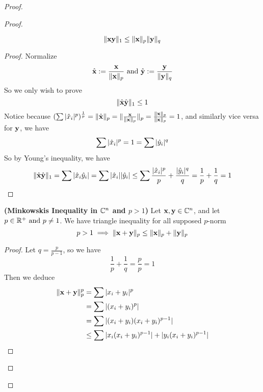\documentclass{report}
\begin{document}
\begin{proof}
\begin{proof}
\begin{theorem}
\begin{equation}
\| \textbf{xy} \|_1\leq \| \textbf{x} \|_p\| \textbf{y} \|_q
\end{equation}
\end{theorem}
\begin{proof}
Normalize 
\begin{equation}
\hat{\textbf{x}}:= \frac{\textbf{x}}{\| \textbf{x} \|_p}\text{ and }\hat{\textbf{y}}:=\frac{\textbf{y}}{\| \textbf{y} \|_q}
\end{equation}
So we only wish to prove
\begin{equation}
\| \hat{\textbf{x}}\hat{\textbf{y}} \|_1\leq 1 
\end{equation}
Notice because $(\sum |\hat{x}_i|^p)^{\frac{1}{p}}=\| \hat{\textbf{x}} \|_p=\| \frac{\textbf{x}}{\| \textbf{x} \|_p} \|_p=\frac{\| \textbf{x} \|_p}{\| \textbf{x} \|_p}=1$, and similarly vice versa for $\textbf{y}$, we have \begin{equation}
\sum |\hat{x}_i|^p=1=\sum |\hat{y}_i|^q \end{equation} So by Young's inequality, we have \begin{equation} \| \hat{\textbf{x}}\hat{\textbf{y}} \|_1= \sum |\hat{x }_i\hat{y}_i|=\sum |\hat{x}_i||\hat{y}_i|\leq \sum \frac{|\hat{x}_i|^p}{p}+\frac{|\hat{y}_i|^q}{q}=\frac{1}{p}+\frac{1}{q}=1
\end{equation}
\end{proof}
\begin{corollary}
\label{5.1.4}
\textbf{(Minkowskis Inequality in $\mathbb{C}^n$ and $p>1$)} Let $\textbf{x},\textbf{y}\in\mathbb{C}^n$, and let $p\in \mathbb{R}^+\text{ and }p\neq 1$. We have triangle inequality for all supposed $p$-norm
\begin{equation}
p>1\implies  \| \textbf{x}+\textbf{y} \|_p\leq \| \textbf{x} \|_p+\| \textbf{y} \|_p
\end{equation}
\end{corollary}
\begin{proof}
Let $q=\frac{p}{p-1}$, so we have
\begin{equation}
\frac{1}{p}+\frac{1}{q}=\frac{p}{p}=1
\end{equation}
Then we deduce 
\begin{align}
  \norm{\vecta{x}+\vecta{y}}_p^p&=\sum \abso{x_i+y_i}^p\\
&= \sum \abso{(x_i+y_i)^{p}}\\
                                &=\sum \abso{(x_i+y_i)(x_i+y_i)^{p-1}}\\
                                &\leq \sum \abso{x_i(x_i+y_i)^{p-1}}+\abso{y_i(x_i+y_i)^{p-1}}\\

\end{align}
\end{proof}
\end{proof}
\end{proof}
\end{document}
